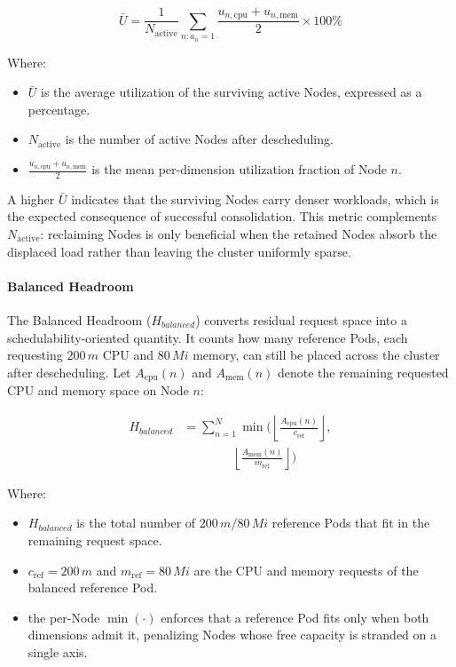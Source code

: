 \[
\bar{U}
=
\frac{1}{N_{\text{active}}}
\sum_{n : a_n = 1}
\frac{u_{n,\text{cpu}} + u_{n,\text{mem}}}{2}
\times 100\%
\]

Where:

\begin{itemize}
    \item \(\bar{U}\) is the average utilization of the surviving active Nodes, expressed as a percentage.

    \item \(N_{\text{active}}\) is the number of active Nodes after descheduling.

    \item \(\frac{u_{n,\text{cpu}} + u_{n,\text{mem}}}{2}\) is the mean per-dimension utilization fraction of Node \(n\).
\end{itemize}

A higher \(\bar{U}\) indicates that the surviving Nodes carry denser workloads, which is the expected consequence of successful consolidation. This metric complements \(N_{\text{active}}\): reclaiming Nodes is only beneficial when the retained Nodes absorb the displaced load rather than leaving the cluster uniformly sparse.

\paragraph{Balanced Headroom}
\label{subsubsec:defrag_metric_headroom}
The Balanced Headroom (\(H_{balanced}\)) converts residual request space into a schedulability-oriented quantity. It counts how many reference Pods, each requesting \(200\,m\) CPU and \(80\,Mi\) memory, can still be placed across the cluster after descheduling. Let \(A_{\text{cpu}}(n)\) and \(A_{\text{mem}}(n)\) denote the remaining requested CPU and memory space on Node \(n\):

\[
\begin{aligned}
H_{balanced}
&=
\sum_{n=1}^{N}
\min\!\Biggl(
\left\lfloor
\frac{A_{\text{cpu}}(n)}{c_{\text{ref}}}
\right\rfloor,\\
&\qquad\qquad
\left\lfloor
\frac{A_{\text{mem}}(n)}{m_{\text{ref}}}
\right\rfloor
\Biggr)
\end{aligned}
\]

Where:

\begin{itemize}
    \item \(H_{balanced}\) is the total number of \(200\,m/80\,Mi\) reference Pods that fit in the remaining request space.

    \item \(c_{\text{ref}} = 200\,m\) and \(m_{\text{ref}} = 80\,Mi\) are the CPU and memory requests of the balanced reference Pod.

    \item the per-Node \(\min(\cdot)\) enforces that a reference Pod fits only when both dimensions admit it, penalizing Nodes whose free capacity is stranded on a single axis.
\end{itemize}

